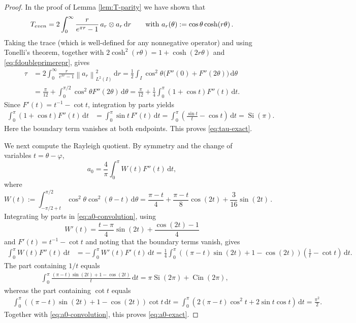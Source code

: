 \documentclass[10pt,a4paper]{amsart}
\newcommand{\norm}[1]{\left\lVert #1\right\rVert}
\newcommand{\dd}{\,\mathrm{d}}
\begin{document}
\begin{proof}
In the proof of Lemma \ref{lem:T-parity} we have shown that
\begin{equation}%
T_{\rm even}
=2\int_0^\infty\frac{r}{e^{\pi r}-1}
\,a_r\otimes a_r\dd r
\qquad\text{with}\
a_r(\theta):=\cos\theta\cosh(r\theta) \,.
\end{equation}
Taking the trace (which is well-defined for any nonnegative operator) and using Tonelli's
theorem, together with
$2\cosh^2(r\theta)=1+\cosh(2r\theta)$ and
\eqref{eq:fdoubleprimerepr}, gives
\begin{align*}
\tau
&=2\int_0^\infty\frac{r}{e^{\pi r}-1}\norm{a_r}_{L^2(I)}^2\dd r
=\frac12\int_I\cos^2\theta
\bigl(F''(0)+F''(2\theta)\bigr)\dd\theta \\
& =\frac{\pi}{12}
+\int_0^{\pi/2}\cos^2\theta F''(2\theta)\dd\theta 
=\frac{\pi}{12}
+\frac14\int_0^\pi(1+\cos t)F''(t)\dd t.
\end{align*}
Since $F'(t)=t^{-1}-\cot t$, integration by parts yields
\begin{align*}
\int_0^\pi(1+\cos t)F''(t)\dd t
&=\int_0^\pi\sin t\,F'(t)\dd t
=\int_0^\pi\left(\frac{\sin t}{t}-\cos t\right)\dd t
=\operatorname{Si}(\pi).
\end{align*}
Here the boundary term vanishes at both endpoints.  This proves
\eqref{eq:tau-exact}.

We next compute the Rayleigh quotient.  By symmetry and the change of
variables $t=\theta-\varphi$,
\begin{equation}\label{eq:a0-convolution}
a_0=\frac4\pi\int_0^\pi W(t)F''(t)\dd t,
\end{equation}
where
\[
W(t):=\int_{-\pi/2+t}^{\pi/2}
\cos^2\theta\cos^2(\theta-t)\dd\theta =\frac{\pi-t}{4}
+\frac{\pi-t}{8}\cos(2t)+\frac{3}{16}\sin(2t) \,.
\]
Integrating by parts in \eqref{eq:a0-convolution}, using
\begin{equation}\label{eq:W-prime}
W'(t)=\frac{t-\pi}{4}\sin(2t)
+\frac{\cos(2t)-1}{4}
\end{equation}
and $F'(t)=t^{-1}-\cot t$ and noting that the boundary terms vanish, gives
\begin{align*}
\int_0^\pi W(t)F''(t)\dd t
&=-\int_0^\pi W'(t)F'(t)\dd t
=\frac14\int_0^\pi
\left((\pi-t)\sin(2t)+1-\cos(2t)\right)
\left(\frac1t-\cot t\right)\dd t.
\end{align*}
The part containing $1/t$ equals
\begin{align*}
&\int_0^\pi
\frac{(\pi-t)\sin(2t)+1-\cos(2t)}{t}\dd t =\pi\operatorname{Si}(2\pi)
+\operatorname{Cin}(2\pi),
\end{align*}
whereas the part containing $\cot t$ equals
\begin{align*}
&\int_0^\pi
\left((\pi-t)\sin(2t)+1-\cos(2t)\right)\cot t\dd t
=\int_0^\pi
\left(2(\pi-t)\cos^2t+2\sin t\cos t\right)\dd t
=\frac{\pi^2}{2}.
\end{align*}
Together with \eqref{eq:a0-convolution}, this proves
\eqref{eq:a0-exact}.


\end{proof}
\end{document}
